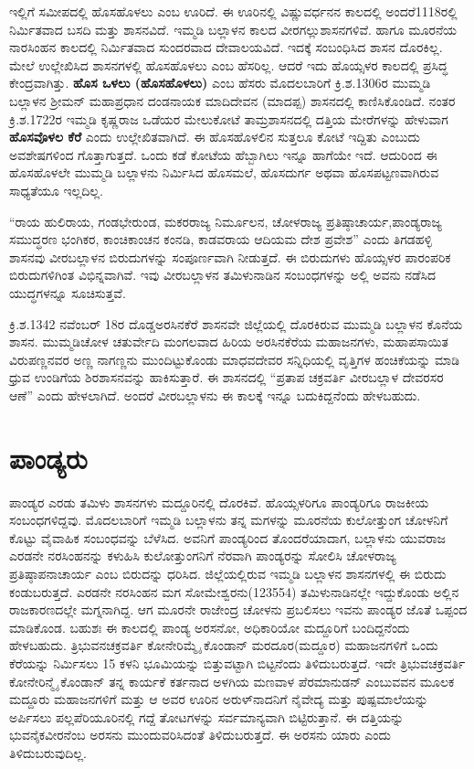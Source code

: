 ಇಲ್ಲಿಗೆ ಸಮೀಪದಲ್ಲಿ ಹೊಸಹೊಳಲು ಎಂಬ ಊರಿದೆ. ಈ ಊರಿನಲ್ಲಿ ವಿಷ್ಣುವರ್ಧನನ ಕಾಲದಲ್ಲಿ ಅಂದರೆ1118ರಲ್ಲಿ ನಿರ್ಮಿತವಾದ ಬಸದಿ ಮತ್ತು ಶಾಸನವಿದೆ. ಇಮ್ಮಡಿ ಬಲ್ಲಾಳನ ಕಾಲದ ವೀರಗಲ್ಲುಶಾಸನಗಳಿವೆ. ಹಾಗೂ ಮೂರನೆಯ ನಾರಸಿಂಹನ ಕಾಲದಲ್ಲಿ ನಿರ್ಮಿತವಾದ ಸುಂದರವಾದ ದೇವಾಲಯವಿದೆ. ಇದಕ್ಕೆ ಸಂಬಂಧಿಸಿದ ಶಾಸನ ದೊರಕಿಲ್ಲ. ಮೇಲೆ ಉಲ್ಲೇಖಿಸಿದ ಶಾಸನಗಳಲ್ಲಿ ಹೊಸಹೊಳಲು ಎಂಬ ಹೆಸರಿಲ್ಲ. ಆದರೆ ಇದು ಹೊಯ್ಸಳರ ಕಾಲದಲ್ಲಿ ಪ್ರಸಿದ್ಧ ಕೇಂದ್ರವಾಗಿತ್ತು. \textbf{ಹೊಸ ಒಳಲು (ಹೊಸಹೊಳಲು)} ಎಂಬ ಹೆಸರು ಮೊದಲಬಾರಿಗೆ ಕ್ರಿ.ಶ.1306ರ ಮುಮ್ಮಡಿ ಬಲ್ಲಾಳನ ಶ‍್ರೀಮನ್​ ಮಹಾಪ್ರಧಾನ ದಂಡನಾಯಕ ಮಾದಿದೇವನ (ಮಾದಪ್ಪ) ಶಾಸನದಲ್ಲಿ ಕಾಣಿಸಿಕೊಂಡಿದೆ. ನಂತರ ಕ್ರಿ.ಶ.1722ರ ಇಮ್ಮಡಿ ಕೃಷ್ಣರಾಜ ಒಡೆಯರ ಮೇಲುಕೋಟೆ ತಾಮ್ರಶಾಸನದಲ್ಲಿ ದತ್ತಿಯ ಮೇರೆಗಳನ್ನು ಹೇಳುವಾಗ \textbf{ಹೊಸವೊಳಲ ಕೆರೆ} ಎಂದು ಉಲ್ಲೇಖಿತವಾಗಿದೆ. ಈ ಹೊಸಹೊಳಲಿನ ಸುತ್ತಲೂ ಕೋಟೆ ಇದ್ದಿತು ಎಂಬುದು ಅವಶೇಷಗಳಿಂದ ಗೊತ್ತಾಗುತ್ತದೆ. ಒಂದು ಕಡೆ ಕೋಟೆಯ ಹೆಬ್ಬಾಗಿಲು ಇನ್ನೂ ಹಾಗೆಯೇ ಇದೆ. ಆದುರಿಂದ ಈ ಹೊಸಹೊಳಲೇ ಮುಮ್ಮಡಿ ಬಲ್ಲಾಳನು ನಿರ್ಮಿಸಿದ ಹೊಸಮಲೆ, ಹೊಸದುರ್ಗ ಅಥವಾ ಹೊಸಪಟ್ಟಣವಾಗಿರುವ ಸಾಧ್ಯತೆಯೂ ಇಲ್ಲದಿಲ್ಲ.

“ರಾಯ ಹುಲಿರಾಯ, ಗಂಡಭೇರುಂಡ, ಮಕರರಾಜ್ಯ ನಿರ್ಮೂಲನ, ಚೋಳರಾಜ್ಯ ಪ್ರತಿಷ್ಠಾಚಾರ್ಯ,\break ಪಾಂಡ್ಯರಾಜ್ಯ ಸಮುದ್ಧರಣ ಭಂಗಿಕರ, ಕಾಂಚಿಕಾಂಚನ ಕಂನಡಿ, ಕಾಡವರಾಯ ಆದಿಯಮ ದೇಶ ಪ್ರವೇಶ” ಎಂದು ತಿಗಡಹಳ್ಳಿ ಶಾಸನವು ವೀರಬಲ್ಲಾಳನ ಬಿರುದುಗಳನ್ನು ಸಂಪೂರ್ಣವಾಗಿ ನೀಡುತ್ತದೆ. ಈ ಬಿರುದುಗಳು ಹೊಯ್ಸಳರ ಪಾರಂಪರಿಕ ಬಿರುದುಗಳಿಗಿಂತ ವಿಭಿನ್ನವಾಗಿವೆ. ಇವು ವೀರಬಲ್ಲಾಳನ ತಮಿಳುನಾಡಿನ ಸಂಬಂಧಗಳನ್ನು ಅಲ್ಲಿ ಅವನು ನಡೆಸಿದ ಯುದ್ಧಗಳನ್ನೂ ಸೂಚಿಸುತ್ತವೆ.

ಕ್ರಿ.ಶ.1342 ನವೆಂಬರ್​ 18ರ ದೊಡ್ಡಅರಸಿನಕೆರೆ ಶಾಸನವೇ ಜಿಲ್ಲೆಯಲ್ಲಿ ದೊರಕಿರುವ ಮುಮ್ಮಡಿ ಬಲ್ಲಾಳನ ಕೊನೆಯ ಶಾಸನ. ಮುಮ್ಮಡಿಚೋಳ ಚತುರ್ವೇದಿ ಮಂಗಲವಾದ ಹಿರಿಯ ಅರಸಿನಕೆರೆಯ ಮಹಾಜನಗಳು, ಮಹಾಪಸಾಯಿತ ವಿರುಪಣ್ಣನವರ ಅಣ್ಣ ನಾಗಣ್ಣನು ಮುಂದಿಟ್ಟುಕೊಂಡು ಮಾಧವದೇವರ ಸನ್ನಿಧಿಯಲ್ಲಿ ವೃತ್ತಿಗಳ ಹಂಚಿಕೆಯನ್ನು ಮಾಡಿ ಧ್ರುವ ಉಂಡಿಗೆಯ ಶಿರಶಾಸನವನ್ನು ಹಾಕಿಸುತ್ತಾರೆ. ಈ ಶಾಸನದಲ್ಲಿ “ಪ್ರತಾಪ ಚಕ್ರವರ್ತಿ ವೀರಬಲ್ಲಾಳ ದೇವರಸರ ಆಣೆ” ಎಂದು ಹೇಳಲಾಗಿದೆ. ಅಂದರೆ ವೀರಬಲ್ಲಾಳನು ಈ ಕಾಲಕ್ಕೆ ಇನ್ನೂ ಬದುಕಿದ್ದನೆಂದು ಹೇಳಬಹುದು.


\section{ಪಾಂಡ್ಯರು}

ಪಾಂಡ್ಯರ ಎರಡು ತಮಿಳು ಶಾಸನಗಳು ಮದ್ದೂರಿನಲ್ಲಿ ದೊರಕಿವೆ. ಹೊಯ್ಸಳರಿಗೂ ಪಾಂಡ್ಯರಿಗೂ ರಾಜಕೀಯ ಸಂಬಂಧಗಳಿ\-ದ್ದವು. ಮೊದಲಬಾರಿಗೆ ಇಮ್ಮಡಿ ಬಲ್ಲಾಳನು ತನ್ನ ಮಗಳನ್ನು ಮೂರನೆಯ ಕುಲೋತ್ತುಂಗ ಚೋಳನಿಗೆ ಕೊಟ್ಟು ವೈವಾಹಿಕ ಸಂಬಂಧವನ್ನು ಬೆಳೆಸಿದ. ಅವನಿಗೆ ಪಾಂಡ್ಯರಿಂದ ತೊಂದರೆಯಾದಾಗ, ಬಲ್ಲಾಳನು ಯುವರಾಜ ಎರಡನೇ ನರಸಿಂಹನನ್ನು ಕಳುಹಿಸಿ ಕುಲೋತ್ತುಂಗನಿಗೆ ನೆರವಾಗಿ ಪಾಂಡ್ಯರನ್ನು ಸೋಲಿಸಿ ಚೋಳರಾಜ್ಯ ಪ್ರತಿಷ್ಠಾಪನಾಚಾರ್ಯ ಎಂಬ ಬಿರುದನ್ನು ಧರಿಸಿದ. ಜಿಲ್ಲೆಯಲ್ಲಿರುವ ಇಮ್ಮಡಿ ಬಲ್ಲಾಳನ ಶಾಸನಗಳಲ್ಲಿ ಈ ಬಿರುದು ಕಂಡುಬರುತ್ತದೆ. ಎರಡನೇ ನರಸಿಂಹನ ಮಗ ಸೋಮೇಶ್ವರನು(1235\enginline{-}54) ತಮಿಳುನಾಡಿನಲ್ಲೇ ಇದ್ದುಕೊಂಡು ಅಲ್ಲಿನ ರಾಜಕಾರಣದಲ್ಲೇ ಮಗ್ನನಾಗಿದ್ದ. ಆಗ ಮೂರನೇ ರಾಜೇಂದ್ರ ಚೋಳನು ಪ್ರಬಲಿಸಲು ಇವನು ಪಾಂಡ್ಯರ ಜೊತೆ ಒಪ್ಪಂದ ಮಾಡಿಕೊಂಡ. ಬಹುಶಃ ಈ ಕಾಲದಲ್ಲಿ ಪಾಂಡ್ಯ ಅರಸನೋ, ಅಧಿಕಾರಿಯೋ ಮದ್ದೂರಿಗೆ ಬಂದಿದ್ದನೆಂದು ಹೇಳಬಹುದು. ತ್ರಿಭುವನಚಕ್ರವರ್ತಿ ಕೋನೇರಿಮ್ಮೈ ಕೊಂಡಾನ್​ ಮರದೂರ(ಮದ್ದೂರ) ಮಹಾಜನಗಳಿಗೆ ಒಂದು ಕೆರೆಯನ್ನು ನಿರ್ಮಿಸಲು 15 ಕಳನಿ ಭೂಮಿಯನ್ನು ಬಿತ್ತುವಟ್ಟಾಗಿ ಬಿಟ್ಟನೆಂದು ತಿಳಿದುಬರುತ್ತದೆ. ಇದೇ ತ್ರಿಭುವಚಕ್ರವರ್ತಿ ಕೋನೇರಿನ್ಮೈ ಕೊಂಡಾನ್​ ತನ್ನ ಕಾರ್ಯಕೆ ಕರ್ತನಾದ ಅಳಗಿಯ ಮಣವಾಳ ಪೆರಮಾನುಡನ್​ ಎಂಬುವವನ ಮೂಲಕ ಮದ್ದೂರು ಮಹಾಜನಗಳಿಗೆ ಮತ್ತು ಆ ಅವರ ಊರಿನ ಅರುಳ್​ನಾದನಿಗೆ ನೈವೇದ್ಯ ಮತ್ತು ಪುಷ್ಪಮಾಲೆಯನ್ನು ಅರ್ಪಿಸಲು ಪಲ್ಲಪೆರಿಯೂರಿನಲ್ಲಿ ಗದ್ದೆ ತೋಟಗಳನ್ನು ಸರ್ವಮಾನ್ಯವಾಗಿ ಬಿಟ್ಟಿರುತ್ತಾನೆ. ಈ ದತ್ತಿಯನ್ನು ಭುವನೈಕವೀರನೆಂಬ ಅರಸನು ಮುಂದುವರಿಸಿದಂತೆ ತಿಳಿದುಬರುತ್ತದೆ. ಈ ಅರಸನು ಯಾರು ಎಂದು ತಿಳಿದುಬರುವುದಿಲ್ಲ.


